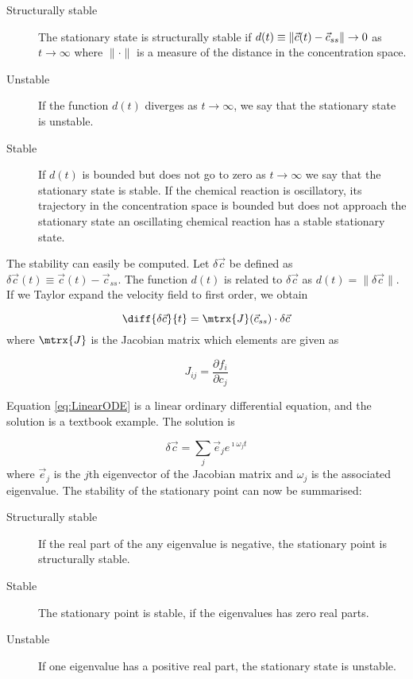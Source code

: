 \begin{description}
  \item[Structurally stable] The stationary state is structurally stable
    if \protect$d(t) \equiv \|\vec{c}(t) - \vec{c}_{ss}\| \rightarrow 0\protect$
    as $t \rightarrow \infty$ where $\|\cdot\|$ is a measure of the
    distance in the concentration space.
  \item[Unstable] If the function $d(t)$ diverges as $t \rightarrow
    \infty$, we say that the stationary state is unstable.
  \item[Stable] If $d(t)$ is bounded but does not go to zero as
    $t \rightarrow \infty$ we say that the stationary state is
    stable. If the chemical reaction is oscillatory, its
    trajectory in the concentration space is bounded but does not
    approach the stationary state \ie an oscillating chemical reaction
    has a stable stationary state.
\end{description}

The stability can easily be computed. Let $\delta \vec{c}$ be defined
as $\delta\vec{c}(t) \equiv \vec{c}(t)-\vec{c}_{ss}$. The function
$d(t)$ is related to $\delta\vec{c}$ as $d(t) = \|\delta\vec{c}\|$. If
we Taylor expand the velocity field to first order, we obtain

\begin{equation}
\label{eq:LinearODE}
  \diff{\delta\vec{c}}{t} = \mtrx{J}(\vec{c}_{ss})\cdot \delta\vec{c}
\end{equation}
where $\mtrx{J}$ is the Jacobian matrix which elements are given as

\begin{equation}
  J_{ij} = \frac{\partial f_i}{\partial c_j}
\end{equation}

Equation \eqref{eq:LinearODE} is a linear ordinary differential
equation, and the solution is a textbook example. The solution is

\begin{equation}
  \delta\vec{c} = \sum_{j} \vec{e}_j e^{\imath \omega_j t}
\end{equation}
where $\vec{e}_j$ is the $j$th eigenvector of the Jacobian matrix and
$\omega_j$ is the associated eigenvalue. The stability of the
stationary point can now be summarised:

\begin{description}
\item[Structurally stable] If the real part of the any eigenvalue is
  negative, the stationary point is structurally stable.
\item[Stable] The stationary point is stable, if the
  eigenvalues has zero real parts.
\item[Unstable] If one eigenvalue has a positive real part, the
  stationary state is unstable.
\end{description}

